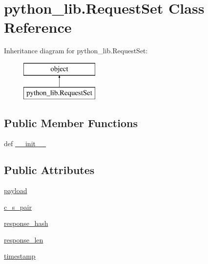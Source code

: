 \hypertarget{classpython__lib_1_1_request_set}{\section{python\-\_\-lib.\-Request\-Set Class Reference}
\label{classpython__lib_1_1_request_set}
}
Inheritance diagram for python\-\_\-lib.\-Request\-Set\-:\begin{figure}[H]
\begin{center}
\leavevmode
\includegraphics[height=2.000000cm]{classpython__lib_1_1_request_set}
\end{center}
\end{figure}
\subsection*{Public Member Functions}
\begin{DoxyCompactItemize}
\item 
def \hyperlink{classpython__lib_1_1_request_set_a02cf5b19c9bede07be06458eae79a544}{\-\_\-\-\_\-init\-\_\-\-\_\-}
\end{DoxyCompactItemize}
\subsection*{Public Attributes}
\begin{DoxyCompactItemize}
\item 
\hyperlink{classpython__lib_1_1_request_set_ae1fd45c566f5f08902900f335d30d4db}{payload}
\item 
\hyperlink{classpython__lib_1_1_request_set_a826cc1aaaaceb16fc03237046bab4792}{c\-\_\-s\-\_\-pair}
\item 
\hyperlink{classpython__lib_1_1_request_set_a5b22a41c3e54fa9879cffa18bc5ca65b}{response\-\_\-hash}
\item 
\hyperlink{classpython__lib_1_1_request_set_aa420f3fe719844f676b06ce5ceb67da0}{response\-\_\-len}
\item 
\hyperlink{classpython__lib_1_1_request_set_a7a93e544e11b330069fe9d5fc7ccdef3}{timestamp}
\end{DoxyCompactItemize}


